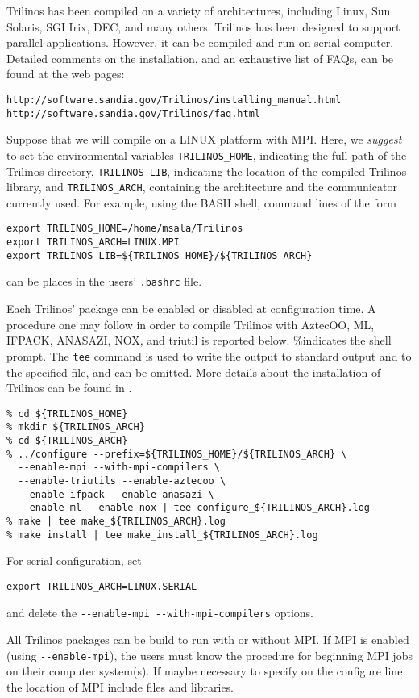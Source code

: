 Trilinos has been compiled on a variety of architectures, including
Linux, Sun Solaris, SGI Irix, DEC, and many others. Trilinos has been
designed to support parallel applications. However, it can be compiled
and run on serial computer.  Detailed comments on the installation, and
an exhaustive list of FAQs, can be found at the web pages:
\begin{verbatim}
http://software.sandia.gov/Trilinos/installing_manual.html
http://software.sandia.gov/Trilinos/faq.html
\end{verbatim}


Suppose that we will compile on a LINUX platform with MPI. Here, we {\sl
  suggest} to set the environmental
variables \verb!TRILINOS_HOME!, indicating the full path of the Trilinos
directory, \verb!TRILINOS_LIB!, indicating the location of the compiled
Trilinos library, and \verb!TRILINOS_ARCH!, containing the architecture
and the communicator currently used.  For example, using the BASH shell,
command lines of the form
\begin{verbatim}
export TRILINOS_HOME=/home/msala/Trilinos
export TRILINOS_ARCH=LINUX.MPI
export TRILINOS_LIB=${TRILINOS_HOME}/${TRILINOS_ARCH}
\end{verbatim}
can be places in the users' \verb!.bashrc! file.

\smallskip

Each Trilinos' package can be enabled or disabled at configuration time.
A procedure one may follow in order to compile Trilinos with AztecOO,
ML, IFPACK, ANASAZI, NOX, and triutil is reported below. \%indicates the
shell prompt. The \verb!tee! command is used to write the output to
standard output and to the specified file, and can be omitted.  More
details about the installation of Trilinos can be found in
\cite{Trilinos-Users-Guide}.
\begin{verbatim}
% cd ${TRILINOS_HOME}
% mkdir ${TRILINOS_ARCH}
% cd ${TRILINOS_ARCH}
% ../configure --prefix=${TRILINOS_HOME}/${TRILINOS_ARCH} \
  --enable-mpi --with-mpi-compilers \
  --enable-triutils --enable-aztecoo \
  --enable-ifpack --enable-anasazi \
  --enable-ml --enable-nox | tee configure_${TRILINOS_ARCH}.log
% make | tee make_${TRILINOS_ARCH}.log
% make install | tee make_install_${TRILINOS_ARCH}.log
\end{verbatim}
For serial configuration, set
\begin{verbatim}
export TRILINOS_ARCH=LINUX.SERIAL
\end{verbatim}
and delete the \verb!--enable-mpi --with-mpi-compilers! options.
\begin{remark}
  All Trilinos packages can be build to run with or without MPI. If MPI
  is enabled (using \verb!--enable-mpi!), the users must know the
  procedure for beginning MPI jobs on their computer system(s). If maybe
  necessary to specify on the configure line the location of MPI include
  files and libraries.
\end{remark}

